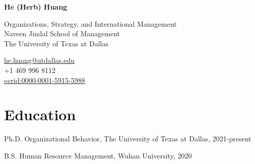 \documentclass[12pt,letterpaper]{report} %
\newcommand{\myname}{He (Herb) Huang}
\newcommand{\namefont}[1]{{\normalfont\bfseries\Huge{#1}}}
\begin{document}
    \raggedright{}

    \namefont{\myname}

    \vspace{1em}
    \begin{minipage}[t]{0.700\textwidth}
        Organizations, Strategy, and International Management \\
        Naveen Jindal School of Management \\
        The University of Texas at Dallas
    \end{minipage}
    \begin{minipage}[t]{0.295\textwidth}
        \flushright{}
        \href{mailto:he.huang@utdallas.edu}{he.huang@utdallas.edu} \\
        +1 469 996 8112 \\
        \href{https://orcid.org/0000-0001-5915-5988}{ocrid:0000-0001-5915-5988}
    \end{minipage}


    \section*{Education}

    \begin{tablist}

        \item[Ph.D.]\tab{}Organizational Behavior, The University of Texas at Dallas, 2021-present
        \item[B.S.] \tab{}Human Resource Management, Wuhan University, 2020

    \end{tablist}





\end{document}
